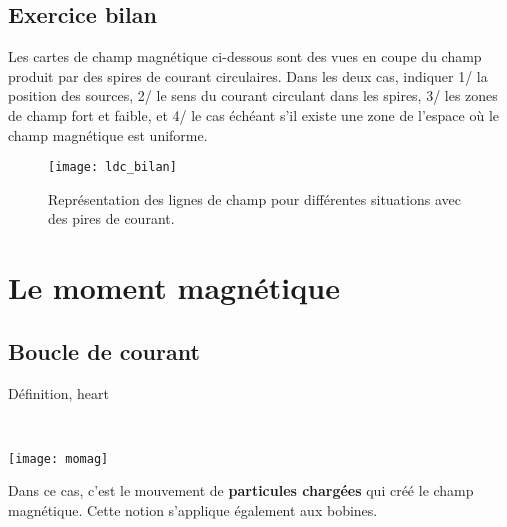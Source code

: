 \documentclass[../main/main.tex]{subfiles}
\begin{document}
\subsection{Exercice bilan}
\label{ssec:bilandir}
Les cartes de champ magnétique ci-dessous sont des vues en coupe du champ
produit par des spires de courant circulaires. Dans les deux cas, indiquer 1/ la
position des sources, 2/ le sens du courant circulant dans les spires, 3/ les
zones de champ fort et faible, et 4/ le cas échéant s'il existe une zone de
l'espace où le champ magnétique est uniforme.
\begin{figure}[h]
	\centering
	\texttt{[image: ldc\_bilan]}
	\caption{Représentation des lignes de champ pour différentes situations avec
		des pires de courant.}
	\label{fig:ldc_bilan}
\end{figure}

\vspace*{-10pt}

\section{Le moment magnétique}
\label{sec:momag}
\subsection{Boucle de courant}
\label{ssec:magboucle}
\begin{tdefi}{Définition, heart}
	\begin{minipage}[t]{.48\linewidth}
	\end{minipage}
	\hfill
	\begin{minipage}[t]{.48\linewidth}
		~
		\vspace{0pt}
		\begin{center}
			\texttt{[image: momag]}
			\label{fig:momag}
		\end{center}
	\end{minipage}
\end{tdefi}

Dans ce cas, c'est le mouvement de \textbf{particules chargées} qui créé le
champ magnétique. Cette notion s'applique également aux bobines.
\end{document}
